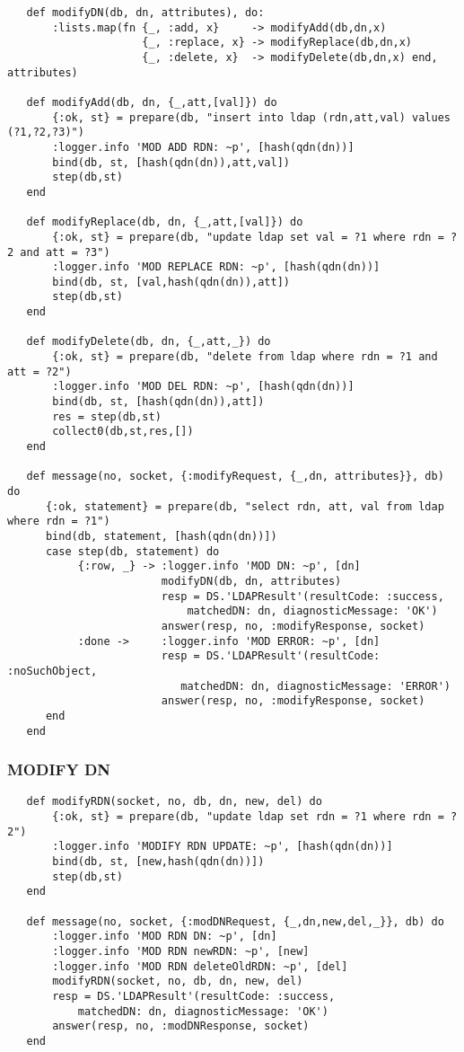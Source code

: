 \begin{lstlisting}
   def modifyDN(db, dn, attributes), do:
       :lists.map(fn {_, :add, x}     -> modifyAdd(db,dn,x)
                     {_, :replace, x} -> modifyReplace(db,dn,x)
                     {_, :delete, x}  -> modifyDelete(db,dn,x) end, attributes)

   def modifyAdd(db, dn, {_,att,[val]}) do
       {:ok, st} = prepare(db, "insert into ldap (rdn,att,val) values (?1,?2,?3)")
       :logger.info 'MOD ADD RDN: ~p', [hash(qdn(dn))]
       bind(db, st, [hash(qdn(dn)),att,val])
       step(db,st)
   end

   def modifyReplace(db, dn, {_,att,[val]}) do
       {:ok, st} = prepare(db, "update ldap set val = ?1 where rdn = ?2 and att = ?3")
       :logger.info 'MOD REPLACE RDN: ~p', [hash(qdn(dn))]
       bind(db, st, [val,hash(qdn(dn)),att])
       step(db,st)
   end

   def modifyDelete(db, dn, {_,att,_}) do
       {:ok, st} = prepare(db, "delete from ldap where rdn = ?1 and att = ?2")
       :logger.info 'MOD DEL RDN: ~p', [hash(qdn(dn))]
       bind(db, st, [hash(qdn(dn)),att])
       res = step(db,st)
       collect0(db,st,res,[])
   end

   def message(no, socket, {:modifyRequest, {_,dn, attributes}}, db) do
      {:ok, statement} = prepare(db, "select rdn, att, val from ldap where rdn = ?1")
      bind(db, statement, [hash(qdn(dn))])
      case step(db, statement) do
           {:row, _} -> :logger.info 'MOD DN: ~p', [dn]
                        modifyDN(db, dn, attributes)
                        resp = DS.'LDAPResult'(resultCode: :success,
                            matchedDN: dn, diagnosticMessage: 'OK')
                        answer(resp, no, :modifyResponse, socket)
           :done ->     :logger.info 'MOD ERROR: ~p', [dn]
                        resp = DS.'LDAPResult'(resultCode: :noSuchObject,
                           matchedDN: dn, diagnosticMessage: 'ERROR')
                        answer(resp, no, :modifyResponse, socket)
      end
   end
\end{lstlisting}

\newpage
\subsubsection{MODIFY DN}

\begin{lstlisting}
   def modifyRDN(socket, no, db, dn, new, del) do
       {:ok, st} = prepare(db, "update ldap set rdn = ?1 where rdn = ?2")
       :logger.info 'MODIFY RDN UPDATE: ~p', [hash(qdn(dn))]
       bind(db, st, [new,hash(qdn(dn))])
       step(db,st)
   end

   def message(no, socket, {:modDNRequest, {_,dn,new,del,_}}, db) do
       :logger.info 'MOD RDN DN: ~p', [dn]
       :logger.info 'MOD RDN newRDN: ~p', [new]
       :logger.info 'MOD RDN deleteOldRDN: ~p', [del]
       modifyRDN(socket, no, db, dn, new, del)
       resp = DS.'LDAPResult'(resultCode: :success,
           matchedDN: dn, diagnosticMessage: 'OK')
       answer(resp, no, :modDNResponse, socket)
   end
\end{lstlisting}

